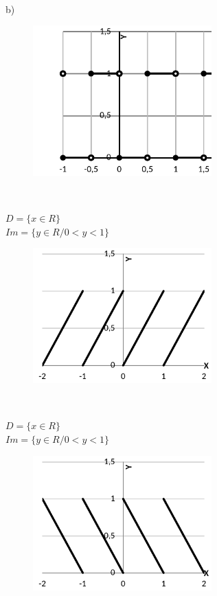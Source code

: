 \begin{respostas}{5}
~~

	b)

	\begin{figure}[H]
		\begin{Center}
			\includegraphics[width=2.71in,height=2.28in]{capitulos/outras_funcoes/media/image75.pdf}
		\end{Center}
	\end{figure}

~~

	\ansitem{} \( D= \{ x \in R \}  \) \\ \( Im= \{ y \in R/0<y<1 \} \)

	\begin{figure}[H]
		\begin{Center}
			\includegraphics[width=2.71in,height=2.05in]{capitulos/outras_funcoes/media/image76.pdf}
		\end{Center}
	\end{figure}

~~

	\ansitem{} \( D= \{ x \in R \}  \) \\ \( Im= \{ y \in R/0<y<1 \} \)

	\begin{figure}[H]
		\begin{Center}
			\includegraphics[width=2.71in,height=2.05in]{capitulos/outras_funcoes/media/image77.pdf}
		\end{Center}
	\end{figure}


\end{respostas}
